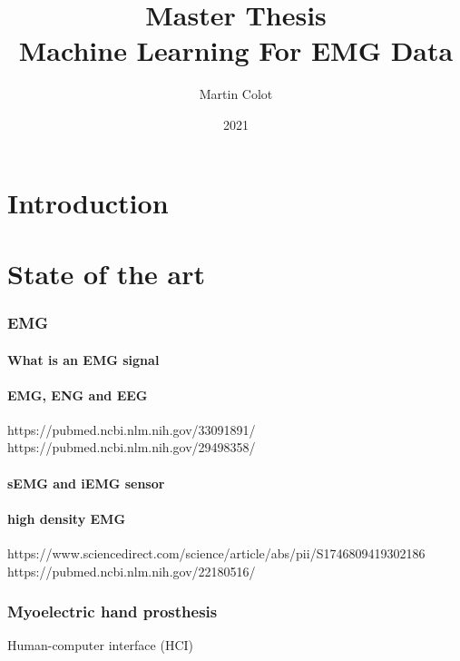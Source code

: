 \documentclass[12pt]{article}
\title{Master Thesis\\Machine Learning For EMG Data}
\author{Martin Colot}
\date{2021}
\begin{document}
	
	\maketitle
	
	\tableofcontents
	\newpage
	
	\part{Introduction}
	
	
	\newpage
	\part{State of the art}
	
	
	
	\section{EMG}
	
	\subsection{What is an EMG signal}
	
	\subsection{EMG, ENG and EEG}
	https://pubmed.ncbi.nlm.nih.gov/33091891/  \\
		https://pubmed.ncbi.nlm.nih.gov/29498358/
		
	\subsection{sEMG and iEMG sensor}
	
	\subsection{high density EMG}
	https://www.sciencedirect.com/science/article/abs/pii/S1746809419302186 \\
	https://pubmed.ncbi.nlm.nih.gov/22180516/

	
	
	\section{Myoelectric hand prosthesis}
	
	Human-computer interface (HCI)
	
	
\end{document}
